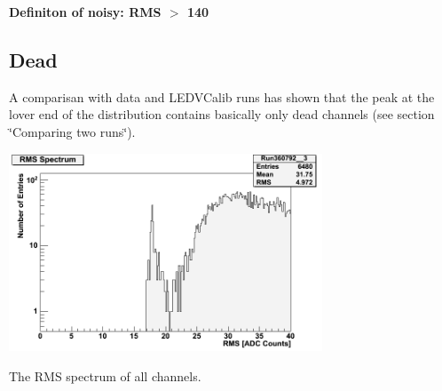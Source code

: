 {\bfseries Definiton of noisy: RMS $>$ 140 }\hypertarget{index_Dead}{}\subsection{Dead}\label{index_Dead}
A comparisan with data and LEDVCalib runs has shown that the peak at the lover end of the distribution contains basically only dead channels (see section \char`\"{}Comparing two runs\char`\"{}).

 
\begin{DoxyImage}
\includegraphics[width=0.7\textwidth]{rms_spectrum_zoom.png}
\caption{The RMS spectrum of all channels.}
\end{DoxyImage}


